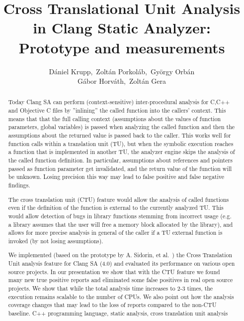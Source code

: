 \documentclass{article}
\title{Cross Translational Unit Analysis in Clang Static Analyzer: Prototype and measurements}
\author{D\'aniel Krupp\inst1,\ Zolt\'an Porkol\'ab\inst1,\ Gy\"orgy Orb\'an\inst1\\
        G\'abor Horv\'ath\inst2,\ Zolt\'an Gera\inst2}
\institute{\inst1Ericsson Ltd., \inst2E\"{o}tv\"{o}s Lor\'{a}nd University, Faculty of Informatics\\
             \inst1\url{daniel.krupp@ericsson.com}, 
             \inst1\url{zoltan.porkolab@ericsson.com},
             \inst1\url{gyorgy.orban@ericsson.com},
             \inst2\url{xazax@caesar.elte.hu}, 
             \inst2\url{gerazo@caesar.elte.hu}}
\begin{document}
\maketitle


\begin{abstract}
Today Clang SA can perform (context-sensitive) inter-procedural analysis for 
C,C++ and Objective C files by ''inlining'' 
the called function into the callers' context. This means that that the full 
calling context
(assumptions about the values of function parameters, global variables) is passed when 
analyzing the called function and
then the assumptions about the returned value is passed back to the caller. 
This works well for function calls within a
translation unit (TU), but when the symbolic execution reaches a function that 
is implemented in another TU, the analyzer engine 
skips the analysis of the called function definition. In particular,
assumptions about references and pointers passed as function 
parameter get invalidated, and the return value of the function will be unknown.
Losing precision this way may lead to false positive
and false negative findings.

The cross translation unit (CTU) feature would allow the analysis of called 
functions even if the definition of the function is external to the currently 
analyzed TU. This would allow detection of bugs in library functions stemming
from incorrect usage (e.g. a library assumes that the user will free a memory 
block allocated by the library), and allows for more precise analysis in
general of the caller if a TU external function is invoked
(by not losing assumptions).

We implemented (based on the prototype by A. Sidorin, et al.~\cite{artemctu})
the Cross Translation Unit analysis feature for Clang SA (4.0) and evaluated 
its performance on various open source projects. In our presentation we show 
that with the CTU feature we found many new true positive reports and 
eliminated some false positives in real open source projects. We show that 
while the total analysis time increases to 2-3 times, the execution remains
scalable to the number of CPUs. We also point out how the analysis
coverage changes that may lead to the loss of reports compared to the 
non-CTU baseline.
\keywords C++ programming language, static analysis, cross translation unit analysis
\end{abstract}

\end{document}
